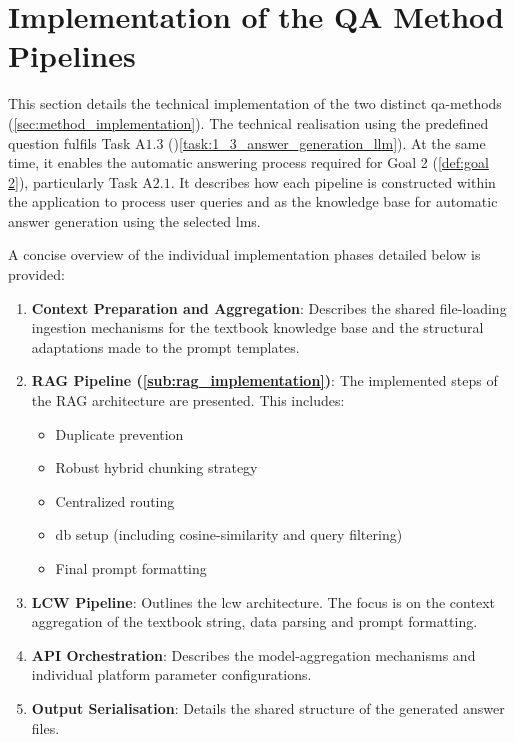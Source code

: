 \section{Implementation of the QA Method Pipelines} 

This section details the technical implementation of the two distinct \ac{qa}-methods (\cref{sec:method_implementation}).
The technical realisation using the predefined question fulfils Task A$1.3$ ()\cref{task:1_3_answer_generation_llm}).
At the same time, it enables the automatic answering process required for Goal 2 (\cref{def:goal 2}), particularly Task A$2.1$.
It describes how each pipeline is constructed within the application to process user queries and \citet{bb2} as the knowledge base for automatic answer generation using the selected \acp{lm}.

A concise overview of the individual implementation phases detailed below is provided:
\begin{enumerate}
    \item \textbf{Context Preparation and Aggregation}: Describes the shared file-loading ingestion mechanisms for the textbook knowledge base and the structural adaptations made to the prompt templates.
    \item \textbf{RAG Pipeline (\cref{sub:rag_implementation})}: The implemented steps of the RAG architecture are presented.
                                                                                            This includes:
                                                                                            \begin{itemize}
                                                                                                \item Duplicate prevention
                                                                                                \item Robust hybrid chunking strategy
                                                                                                \item Centralized routing
                                                                                                \item \ac{db} setup (including cosine-similarity and query filtering)
                                                                                                \item Final prompt formatting
                                                                                            \end{itemize}
    \item \textbf{LCW Pipeline}: Outlines the \ac{lcw} architecture. The focus is on the context aggregation of the textbook string, data parsing and prompt formatting.
    \item \textbf{API Orchestration}: Describes the model-aggregation mechanisms and individual platform parameter configurations.
    \item \textbf{Output Serialisation}: Details the shared structure of the generated answer files.
\end{enumerate}

